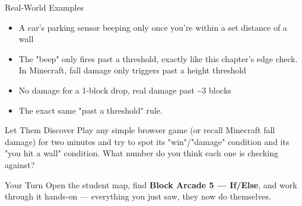 \documentclass[aspectratio=169]{beamer}
\begin{document}
\begin{frame}{Real-World Examples}
    \large
    \begin{itemize}
        \item A car's parking sensor beeping only once you're within a set distance of a wall
        \item The "beep" only fires past a threshold, exactly like this chapter's edge check. In Minecraft, fall damage only triggers past a height threshold
        \item No damage for a 1-block drop, real damage past \textasciitilde{}3 blocks
        \item The exact same "past a threshold" rule.
    \end{itemize}
\end{frame}


\begin{frame}{Let Them Discover}
    \Large
    Play any simple browser game (or recall Minecraft fall damage) for two minutes and try to spot its "win"/"damage" condition and its "you hit a wall" condition. What number do you think each one is checking against?
\end{frame}

\begin{frame}{Your Turn}
    \Large
    Open the student map, find \textbf{Block Arcade 5 — If/Else}, and work through it
    hands-on --- everything you just saw, they now do themselves.
\end{frame}
\end{document}

